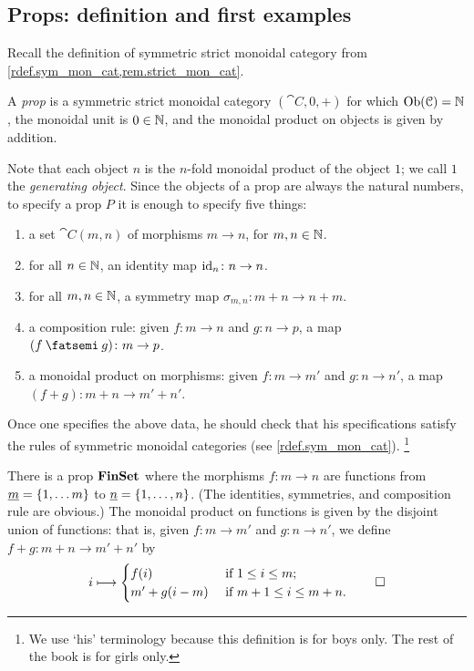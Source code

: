 \documentclass[7Sketches]{subfiles}
\begin{document}
\subsection{Props: definition and first examples}

Recall the definition of symmetric strict monoidal category from
\cref{rdef.sym_mon_cat,rem.strict_mon_cat}.

\begin{definition}%
\label{def.prop}%
A \emph{prop} is a symmetric strict monoidal category $(\cat{C},0,+)$ for which $\operatorname{Ob}(\mathcal{C})=\mathbb{N}$, the monoidal unit is $0\in\mathbb{N}$, and the monoidal product on objects is given by addition.
\end{definition}

Note that each object $n$ is the $n$-fold monoidal product of the object $1$; we
call $1$ the \emph{generating object}. Since the objects of a prop are always
the natural numbers, to specify a prop $P$ it is enough to specify five things:
\begin{enumerate}[label=(\roman*)]
	\item a set $\cat{C}(m,n)$ of morphisms $m\to n$, for $m,n\in\mathbb{N}$.
	\item for all $n \in \mathbb{N}$, an identity map $\mathrm{id}_n\colon n \to n$.
	\item for all $m, n \in \mathbb{N}$, a symmetry map $\sigma_{m,n}\colon m+n \to
	n+m$.%
	\item a composition rule: given $f\colon m \to n$ and $g\colon n \to p$,
	a map $(f\cp g)\colon m \to p$.
	\item a monoidal product on morphisms: given $f\colon m\to m'$ and $g\colon n\to n'$, a map $(f+g)\colon m+n\to m'+n'$.
\end{enumerate}
Once one specifies the above data, he should check that his specifications
satisfy the rules of symmetric monoidal categories (see
\cref{rdef.sym_mon_cat}).%
\footnote{We use `his' terminology because this definition is for boys only. The rest of the book is for girls only.}

\begin{example}%
\label{ex.FinSet_Prop}%
  There is a prop $\mathbf{FinSet}$ where the morphisms $f\colon m \to n$ are
  functions from $\underline{{m}}=\{1,\dots m\}$ to $\underline{{n}}=\{1,\dots,n \}$. (The
  identities, symmetries, and composition rule are obvious.) The monoidal
  product on functions is given by the disjoint union of functions: that is,
  given $f\colon m \to m'$ and $g\colon n \to n'$, we
  define $f+ g\colon m+n \longrightarrow m'+n'$ by
  \begin{equation}%
\label{eqn.mon_prod_finset}
    i \longmapsto 
    \begin{cases}
      f(i) &\mbox{ if }1\leq i\leq m ;\\
      m'+g(i-m) &\mbox{ if }m+1\leq i \leq m+n.
    \end{cases}
    \qedhere
  \end{equation}
\end{example}
\end{document}
